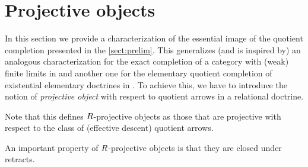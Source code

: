 
\section{Projective objects} 
\label{sect:proj} 

In this section we provide a characterization of the essential image of the quotient completion presented in the \cref{sect:prelim}.
This  generalizes (and is inspired by) an analogous characterization for the exact completion of a category with (weak) finite limits in \cite{CarboniA:freecl,CarboniA:regec} and another one for the elementary quotient completion of existential elementary doctrines in \cite{MaiettiPR24}. 
To achieve this, we have to introduce the notion of \emph{projective object} with respect to quotient arrows in a relational doctrine. 


Note that this defines $R$-projective objects as those that are projective with respect to the class of (effective descent) quotient arrows.   



 An important property of $R$-projective objects is that they are closed under retracts. 

